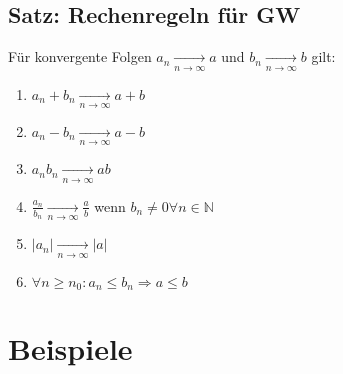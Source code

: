 \documentclass[a4paper,11pt]{article}
\begin{document}
\subsection{Satz: Rechenregeln für GW}
Für konvergente Folgen $a_n\underset{n\to\infty}{\rightarrow}a$ und $b_n\underset{n\to\infty}{\to}b$ gilt:
\begin{enumerate}[label={\alph*)}]
	\item $a_n+b_n\underset{n\to\infty}{\to}a+b$
	\item $a_n-b_n\underset{n\to\infty}{\to}a-b$
	\item $a_nb_n\underset{n\to\infty}{\to}ab$
	\item $\frac{a_n}{b_n}\underset{n\to\infty}{\to}\frac{a}{b}$ wenn $b_n\neq 0\forall n\in\mathbb{N}$
	\item $|a_n|\underset{n\to\infty}{\to}|a|$
	\item $\forall n\geq n_0:a_n\leq b_n\Rightarrow a\leq b$
\end{enumerate}
\section{Beispiele}
\end{document}
